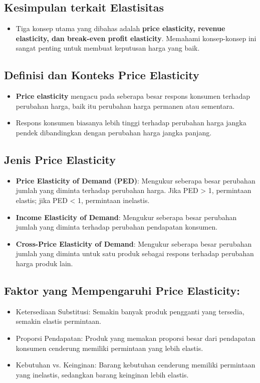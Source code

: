 \documentclass{article}
\begin{document}
\subsection{Kesimpulan terkait Elastisitas}
\begin{itemize}
    \item Tiga konsep utama yang dibahas adalah \textbf{price elasticity, revenue elasticity, dan break-even profit elasticity}. Memahami konsep-konsep ini sangat penting untuk membuat keputusan harga yang baik.
\end{itemize}

\subsection{Definisi dan Konteks Price Elasticity}
\begin{itemize}
    \item \textbf{Price elasticity} mengacu pada seberapa besar respons konsumen terhadap perubahan harga, baik itu perubahan harga permanen atau sementara.
    \item Respons konsumen biasanya lebih tinggi terhadap perubahan harga jangka pendek dibandingkan dengan perubahan harga jangka panjang.
\end{itemize}

\subsection{Jenis Price Elasticity}
\begin{itemize}
    \item \textbf{Price Elasticity of Demand (PED)}: Mengukur seberapa besar perubahan jumlah yang diminta terhadap perubahan harga. Jika PED > 1, permintaan elastis; jika PED < 1, permintaan inelastis.
    \item \textbf{Income Elasticity of Demand}: Mengukur seberapa besar perubahan jumlah yang diminta terhadap perubahan pendapatan konsumen.
    \item \textbf{Cross-Price Elasticity of Demand}: Mengukur seberapa besar perubahan jumlah yang diminta untuk satu produk sebagai respons terhadap perubahan harga produk lain.
\end{itemize}

\subsection{Faktor yang Mempengaruhi Price Elasticity:}
\begin{itemize}
    \item Ketersediaan Substitusi: Semakin banyak produk pengganti yang tersedia, semakin elastis permintaan.
    \item Proporsi Pendapatan: Produk yang memakan proporsi besar dari pendapatan konsumen cenderung memiliki permintaan yang lebih elastis.
    \item Kebutuhan vs. Keinginan: Barang kebutuhan cenderung memiliki permintaan yang inelastis, sedangkan barang keinginan lebih elastis.
\end{itemize}
\end{document}
